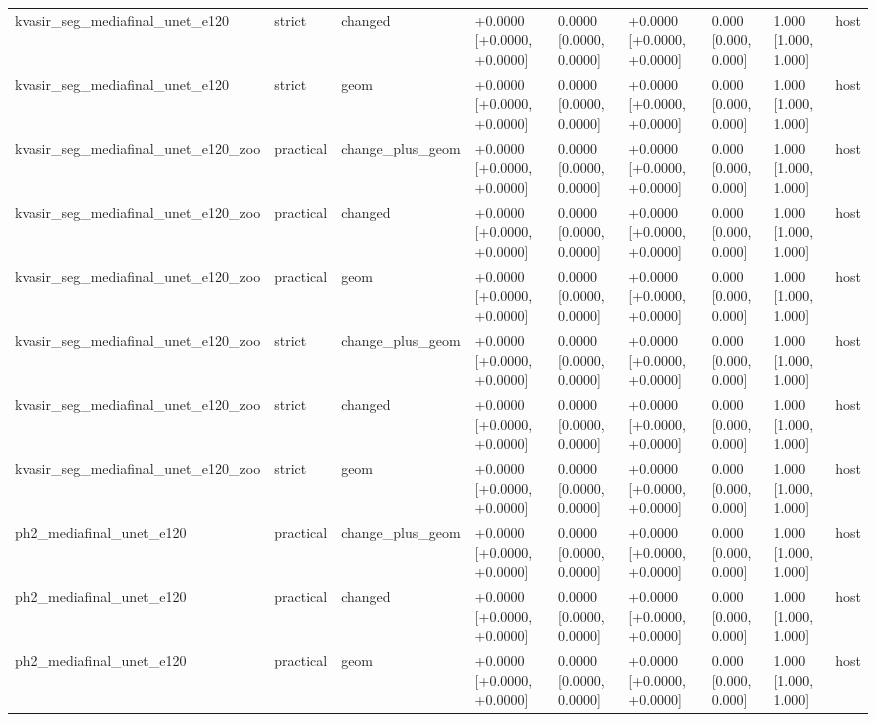 \begin{table}[t]
\begin{tabular}{lllllllll}
kvasir\_seg\_mediafinal\_unet\_e120 & strict & changed & +0.0000 [+0.0000, +0.0000] & 0.0000 [0.0000, 0.0000] & +0.0000 [+0.0000, +0.0000] & 0.000 [0.000, 0.000] & 1.000 [1.000, 1.000] & host \\
kvasir\_seg\_mediafinal\_unet\_e120 & strict & geom & +0.0000 [+0.0000, +0.0000] & 0.0000 [0.0000, 0.0000] & +0.0000 [+0.0000, +0.0000] & 0.000 [0.000, 0.000] & 1.000 [1.000, 1.000] & host \\
kvasir\_seg\_mediafinal\_unet\_e120\_zoo & practical & change\_plus\_geom & +0.0000 [+0.0000, +0.0000] & 0.0000 [0.0000, 0.0000] & +0.0000 [+0.0000, +0.0000] & 0.000 [0.000, 0.000] & 1.000 [1.000, 1.000] & host \\
kvasir\_seg\_mediafinal\_unet\_e120\_zoo & practical & changed & +0.0000 [+0.0000, +0.0000] & 0.0000 [0.0000, 0.0000] & +0.0000 [+0.0000, +0.0000] & 0.000 [0.000, 0.000] & 1.000 [1.000, 1.000] & host \\
kvasir\_seg\_mediafinal\_unet\_e120\_zoo & practical & geom & +0.0000 [+0.0000, +0.0000] & 0.0000 [0.0000, 0.0000] & +0.0000 [+0.0000, +0.0000] & 0.000 [0.000, 0.000] & 1.000 [1.000, 1.000] & host \\
kvasir\_seg\_mediafinal\_unet\_e120\_zoo & strict & change\_plus\_geom & +0.0000 [+0.0000, +0.0000] & 0.0000 [0.0000, 0.0000] & +0.0000 [+0.0000, +0.0000] & 0.000 [0.000, 0.000] & 1.000 [1.000, 1.000] & host \\
kvasir\_seg\_mediafinal\_unet\_e120\_zoo & strict & changed & +0.0000 [+0.0000, +0.0000] & 0.0000 [0.0000, 0.0000] & +0.0000 [+0.0000, +0.0000] & 0.000 [0.000, 0.000] & 1.000 [1.000, 1.000] & host \\
kvasir\_seg\_mediafinal\_unet\_e120\_zoo & strict & geom & +0.0000 [+0.0000, +0.0000] & 0.0000 [0.0000, 0.0000] & +0.0000 [+0.0000, +0.0000] & 0.000 [0.000, 0.000] & 1.000 [1.000, 1.000] & host \\
ph2\_mediafinal\_unet\_e120 & practical & change\_plus\_geom & +0.0000 [+0.0000, +0.0000] & 0.0000 [0.0000, 0.0000] & +0.0000 [+0.0000, +0.0000] & 0.000 [0.000, 0.000] & 1.000 [1.000, 1.000] & host \\
ph2\_mediafinal\_unet\_e120 & practical & changed & +0.0000 [+0.0000, +0.0000] & 0.0000 [0.0000, 0.0000] & +0.0000 [+0.0000, +0.0000] & 0.000 [0.000, 0.000] & 1.000 [1.000, 1.000] & host \\
ph2\_mediafinal\_unet\_e120 & practical & geom & +0.0000 [+0.0000, +0.0000] & 0.0000 [0.0000, 0.0000] & +0.0000 [+0.0000, +0.0000] & 0.000 [0.000, 0.000] & 1.000 [1.000, 1.000] & host \\

\end{tabular}
\end{table}
